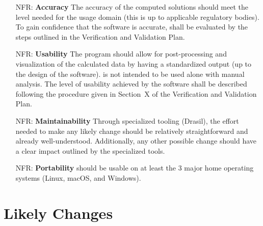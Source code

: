 \documentclass[12pt]{article}
\newcounter{nfrnum} %
\begin{document}
\noindent\begin{itemize}

    \item[NFR\refstepcounter{nfrnum}\thenfrnum \label{NFR_Accuracy}:]
        \textbf{Accuracy} The accuracy of the computed solutions should meet the
        level needed for the usage domain (this is up to applicable regulatory
        bodies). To gain confidence that the software is accurate, \progname{}
        shall be evaluated by the steps outlined in the Verification and
        Validation Plan.

    \item[NFR\refstepcounter{nfrnum}\thenfrnum \label{NFR_Usability}:]
        \textbf{Usability} The program should allow for post-processing and
        visualization of the calculated data by having a standardized output (up
        to the design of the software). \progname{} is not intended to be used
        alone with manual analysis. The level of usability achieved by the
        software shall be described following the procedure given in
        Section~X of the Verification and Validation
        Plan.

    \item[NFR\refstepcounter{nfrnum}\thenfrnum \label{NFR_Maintainability}:]
        \textbf{Maintainability} Through specialized tooling (Drasil), the
        effort needed to make any likely change should be relatively
        straightforward and already well-understood. Additionally, any other
        possible change should have a clear impact outlined by the specialized
        tools.

    \item[NFR\refstepcounter{nfrnum}\thenfrnum \label{NFR_Portability}:]
        \textbf{Portability} \progname{} should be usable on at least the 3
        major home operating systems (Linux, macOS, and Windows).

\end{itemize}



\section{Likely Changes}
\end{document}
